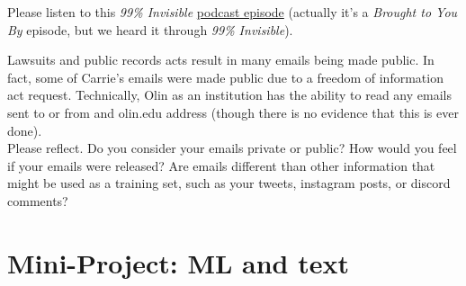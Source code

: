 \documentclass[assignment04_Solutions]{subfiles}
\begin{document}
\begin{exercise}
Please listen to this \emph{99\% Invisible} \href{https://99percentinvisible.org/episode/youve-got-enron-mail/}{podcast episode} (actually it's a \emph{Brought to You By} episode, but we heard it through \emph{99\% Invisible}). 
\end{exercise}
\begin{exercise}
Lawsuits and public records acts result in many emails being made public. In fact, some of Carrie's emails were made public due to a freedom of information act request. Technically, Olin as an institution has the ability to read any emails sent to or from and olin.edu address (though there is no evidence that this is ever done). \\
Please reflect. Do you consider your emails private or public? How would you feel if your emails were released? Are emails different than other information that might be used as a training set, such as your tweets, instagram posts, or discord comments?
\end{exercise}



\section{Mini-Project: ML and text}
\end{document}

